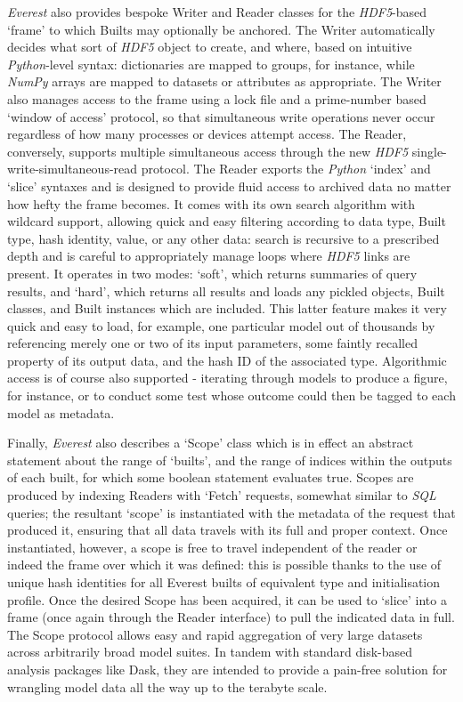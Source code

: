 \documentclass[a4paper,11pt,oneside]{book}
\begin{document}
\textit{Everest} also provides bespoke Writer and Reader classes for the \textit{HDF5}-based `frame' to which Builts may optionally be anchored. The Writer automatically decides what sort of \textit{HDF5} object to create, and where, based on intuitive \textit{Python}-level syntax: dictionaries are mapped to groups, for instance, while \textit{NumPy} arrays are mapped to datasets or attributes as appropriate. The Writer also manages access to the frame using a lock file and a prime-number based `window of access' protocol, so that simultaneous write operations never occur regardless of how many processes or devices attempt access. The Reader, conversely, supports multiple simultaneous access through the new \textit{HDF5} single-write-simultaneous-read protocol. The Reader exports the \textit{Python} `index' and `slice' syntaxes and is designed to provide fluid access to archived data no matter how hefty the frame becomes. It comes with its own search algorithm with wildcard support, allowing quick and easy filtering according to data type, Built type, hash identity, value, or any other data: search is recursive to a prescribed depth and is careful to appropriately manage loops where \textit{HDF5} links are present. It operates in two modes: `soft', which returns summaries of query results, and `hard', which returns all results and loads any pickled objects, Built classes, and Built instances which are included. This latter feature makes it very quick and easy to load, for example, one particular model out of thousands by referencing merely one or two of its input parameters, some faintly recalled property of its output data, and the hash ID of the associated type. Algorithmic access is of course also supported - iterating through models to produce a figure, for instance, or to conduct some test whose outcome could then be tagged to each model as metadata.

Finally, \textit{Everest} also describes a `Scope' class which is in effect an abstract statement about the range of `builts', and the range of indices within the outputs of each built, for which some boolean statement evaluates true. Scopes are produced by indexing Readers with `Fetch' requests, somewhat similar to \textit{SQL} queries; the resultant `scope' is instantiated with the metadata of the request that produced it, ensuring that all data travels with its full and proper context. Once instantiated, however, a scope is free to travel independent of the reader or indeed the frame over which it was defined: this is possible thanks to the use of unique hash identities for all Everest builts of equivalent type and initialisation profile. Once the desired Scope has been acquired, it can be used to `slice' into a frame (once again through the Reader interface) to pull the indicated data in full. The Scope protocol allows easy and rapid aggregation of very large datasets across arbitrarily broad model suites. In tandem with standard disk-based analysis packages like Dask, they are intended to provide a pain-free solution for wrangling model data all the way up to the terabyte scale.
\end{document}

